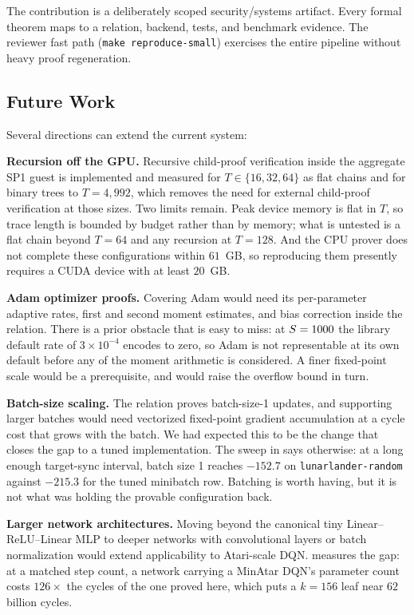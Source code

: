 The contribution is a deliberately scoped security/systems artifact.
Every formal theorem maps to a relation, backend, tests, and benchmark
evidence. The reviewer fast path (\texttt{make reproduce-small}) exercises
the entire pipeline without heavy proof regeneration.

\subsection{Future Work}

Several directions can extend the current system:

\textbf{Recursion off the GPU.} Recursive child-proof verification
inside the aggregate SP1 guest is implemented and measured for
$T \in \{16, 32, 64\}$ as flat chains and for binary trees to $T = 4{,}992$,
which removes the need for external child-proof verification at those sizes.
Two limits remain. Peak device memory is flat in $T$, so trace length is bounded
by budget rather than by memory; what is untested is a flat chain beyond
$T = 64$ and any recursion at $T = 128$.
And the CPU prover does not complete these configurations within $61$~GB, so
reproducing them presently requires a CUDA device with at least $20$~GB.

\textbf{Adam optimizer proofs.} Covering Adam would need its per-parameter
adaptive rates, first and second moment estimates, and bias correction inside
the relation. There is a prior obstacle that is easy to miss: at
$S = 1000$ the library default rate of $3\times 10^{-4}$ encodes to
zero, so Adam is not representable at its own default before any of the moment
arithmetic is considered. A finer fixed-point scale would be a prerequisite,
and would raise the overflow bound in turn.

\textbf{Batch-size scaling.} The relation proves batch-size-1 updates, and
supporting larger batches would need vectorized fixed-point gradient
accumulation at a cycle cost that grows with the batch. We had expected this to
be the change that closes the gap to a tuned implementation. The sweep in
 says otherwise: at a long enough target-sync
interval, batch size 1 reaches $-152.7$ on \texttt{lunarlander-random} against
$-215.3$ for the tuned minibatch row. Batching is worth having, but it is not
what was holding the provable configuration back.

\textbf{Larger network architectures.} Moving beyond the canonical tiny
Linear--ReLU--Linear MLP to deeper networks with convolutional layers or
batch normalization would extend applicability to Atari-scale DQN.
 measures the gap: at a matched step count, a network
carrying a MinAtar DQN's parameter count costs $126\times$ the cycles of the
one proved here, which puts a $k = 156$ leaf near $62$ billion cycles.

